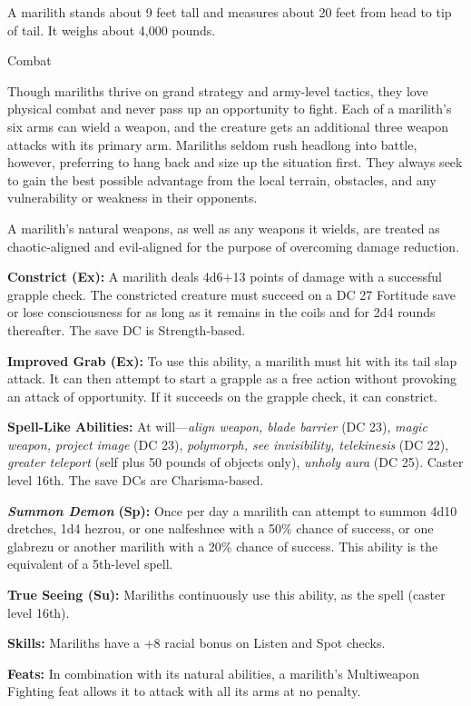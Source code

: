 \documentclass{article}
\begin{document}
A marilith stands about 9 feet tall and measures about 20 feet from head to tip 
of tail. It weighs about 4,000 pounds.

Combat

Though mariliths thrive on grand strategy and army-level tactics, they love physical 
combat and never pass up an opportunity to fight. Each of a marilith's six arms 
can wield a weapon, and the creature gets an additional three weapon attacks with 
its primary arm. Mariliths seldom rush headlong into battle, however, preferring 
to hang back and size up the situation first. They always seek to gain the best 
possible advantage from the local terrain, obstacles, and any vulnerability or 
weakness in their opponents.

A marilith's natural weapons, as well as any weapons it wields, are treated as 
chaotic-aligned and evil-aligned for the purpose of overcoming damage reduction.

\textbf{Constrict (Ex): }A marilith deals 4d6+13 points of damage with a successful 
grapple check. The constricted creature must succeed on a DC 27 Fortitude save 
or lose consciousness for as long as it remains in the coils and for 2d4 rounds 
thereafter. The save DC is Strength-based.

\textbf{Improved Grab (Ex): }To use this ability, a marilith must hit with its 
tail slap attack. It can then attempt to start a grapple as a free action without 
provoking an attack of opportunity. If it succeeds on the grapple check, it can 
constrict.

\textbf{Spell-Like Abilities: }At will---\textit{align weapon, blade barrier }(DC 
23), \textit{magic weapon, project image }(DC 23), \textit{polymorph, see invisibility, 
telekinesis }(DC 22), \textit{greater teleport }(self plus 50 pounds of objects 
only), \textit{unholy aura }(DC 25). Caster level 16th. The save DCs are Charisma-based.

\textit{\textbf{Summon Demon }}\textbf{(Sp):} Once per day a marilith can attempt 
to summon 4d10 dretches, 1d4 hezrou, or one nalfeshnee with a 50\% chance of success, 
or one glabrezu or another marilith with a 20\% chance of success. This ability 
is the equivalent of a 5th-level spell.

\textbf{True Seeing (Su):} Mariliths continuously use this ability, as the spell 
(caster level 16th).

\textbf{Skills:} Mariliths have a +8 racial bonus on Listen and Spot checks.

\textbf{Feats: }In combination with its natural abilities, a marilith's Multiweapon 
Fighting feat allows it to attack with all its arms at no penalty.
\end{document}
